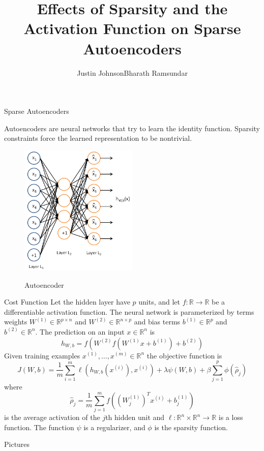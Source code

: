 \documentclass{beamer}
\title[]{Effects of Sparsity and the Activation Function on Sparse Autoencoders}
\author[]{Justin Johnson\quad Bharath Ramsundar}
\date{}
\newcommand{\RR}{\mathbb{R}}
\newcommand{\ra}{\rightarrow}
\newcommand{\Wo}{W^{(1)}}
\newcommand{\Wt}{W^{(2)}}
\newcommand{\bo}{b^{(1)}}
\newcommand{\bt}{b^{(2)}}
\newcommand{\xii}{x^{(i)}}
\begin{document}
\begin{frame}
\maketitle
\end{frame}

\begin{frame}{Sparse Autoencoders}

Autoencoders are neural networks that try to learn the identity function.
Sparsity constraints force the learned representation to be nontrivial.

\begin{figure}[htb]
\begin{center}
\label{proc_sched}
\includegraphics[width=0.5\textwidth]{Autoencoder636.png}
\caption{Autoencoder}
\end{center}
\end{figure}

\end{frame}
\begin{frame}{Cost Function}
\small
Let the hidden layer have $p$ units, and let $f:\RR\ra\RR$ be a differentiable
activation function. The neural network is parameterized by terms weights
$\Wo\in\RR^{p\times n}$ and $\Wt\in\RR^{n\times p}$ and bias terms $\bo\in\RR^p$
and $\bt\in\RR^n$. The prediction on an input
$x\in\RR^n$ is
\[h_{W,b}=f(\Wt f(\Wo x+\bo)+\bt)\]
Given training examples $x^{(1)},\ldots,x^{(m)}\in\RR^n$ the objective function is
\[J(W,b)=\frac1m\sum_{i=1}^m\ell(h_{W,b}(\xii),\xii)+\lambda\psi(W,b)+\beta\sum_{j=1}^p\phi(\hat\rho_j)\]
where 
\[\hat\rho_j=\frac1m\sum_{j=1}^mf\left((\Wo_j)^T\xii+\bo_j\right)\] is 
the average activation of the $j$th hidden unit and
$\ell:\RR^n\times\RR^n\ra\RR$ is a loss function. The function $\psi$ is a
regularizer, and $\phi$ is the sparsity function.
\normalsize
\end{frame}
\begin{frame}{Pictures}

\end{frame}
\end{document}
